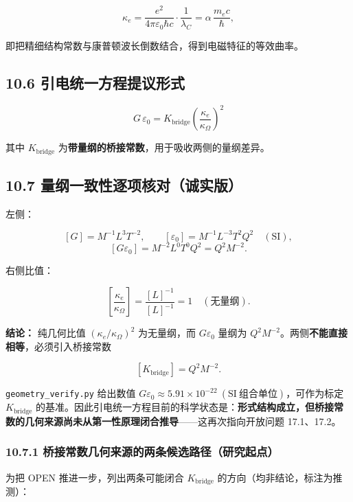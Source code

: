\[
\kappa_e = \frac{e^2}{4\pi\varepsilon_0\hbar c}\cdot \frac{1}{\lambda_C}
= \alpha\,\frac{m_e c}{\hbar},
\]

即把精细结构常数与康普顿波长倒数结合，得到电磁特征的等效曲率。

\subsection{10.6
引电统一方程提议形式}\label{ux5f15ux7535ux7edfux4e00ux65b9ux7a0bux63d0ux8baeux5f62ux5f0f}

\[
\boxed{G\,\varepsilon_0 = K_{\mathrm{bridge}}\left(\frac{\kappa_e}{\kappa_\Omega}\right)^2}
\]

其中 \(K_{\mathrm{bridge}}\)
为\textbf{带量纲的桥接常数}，用于吸收两侧的量纲差异。

\subsection{10.7
量纲一致性逐项核对（诚实版）}\label{ux91cfux7eb2ux4e00ux81f4ux6027ux9010ux9879ux6838ux5bf9ux8bdaux5b9eux7248}

左侧：

\[
[G]=M^{-1}L^3T^{-2},\qquad [\varepsilon_0]=M^{-1}L^{-3}T^2Q^2\quad(\text{SI}),
\] \[
[G\varepsilon_0]=M^{-2}L^0T^0Q^2 = Q^2 M^{-2}.
\]

右侧比值：

\[
\left[\frac{\kappa_e}{\kappa_\Omega}\right]=\frac{[L]^{-1}}{[L]^{-1}}=1 \quad(\text{无量纲}).
\]

\textbf{结论：} 纯几何比值 \((\kappa_e/\kappa_\Omega)^2\) 为无量纲，而
\(G\varepsilon_0\) 量纲为
\(Q^2M^{-2}\)。两侧\textbf{不能直接相等}，必须引入桥接常数

\[
[K_{\mathrm{bridge}}]=Q^2 M^{-2}.
\]

\texttt{geometry\_verify.py} 给出数值
\(G\varepsilon_0\approx 5.91\times10^{-22}\ \mathrm{(SI\ 组合单位)}\)，可作为标定
\(K_{\mathrm{bridge}}\)
的基准。因此引电统一方程目前的科学状态是：\textbf{形式结构成立，但桥接常数的几何来源尚未从第一性原理闭合推导}------这再次指向开放问题
17.1、17.2。

\subsubsection{10.7.1
桥接常数几何来源的两条候选路径（研究起点）}\label{ux6865ux63a5ux5e38ux6570ux51e0ux4f55ux6765ux6e90ux7684ux4e24ux6761ux5019ux9009ux8defux5f84ux7814ux7a76ux8d77ux70b9}

为把 OPEN 推进一步，列出两条可能闭合 \(K_{\mathrm{bridge}}\)
的方向（均非结论，标注为推测）：

